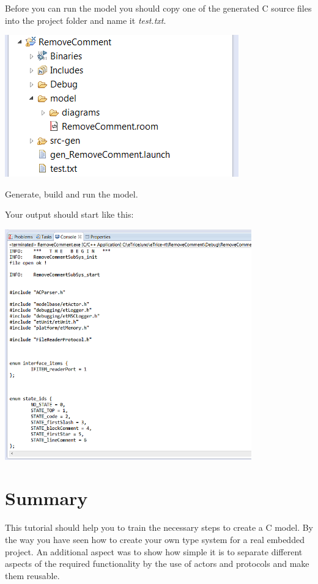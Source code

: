 Before you can run the model you should copy one of the generated C source files into the project folder and name it \textit{test.txt}. 

\includegraphics{images/036-RemoveCommentC07.png}

Generate, build and run the model.

Your output should start like this:

\includegraphics[width=0.8\textwidth]{images/036-RemoveCommentC08.png}


\section{Summary}

This tutorial should help you to train the necessary steps to create a C model. By the way you have seen how to create your own type system for a real embedded project. An additional aspect was to show how simple it is to separate different aspects of the required functionality by the use of actors and protocols and make them reusable.

